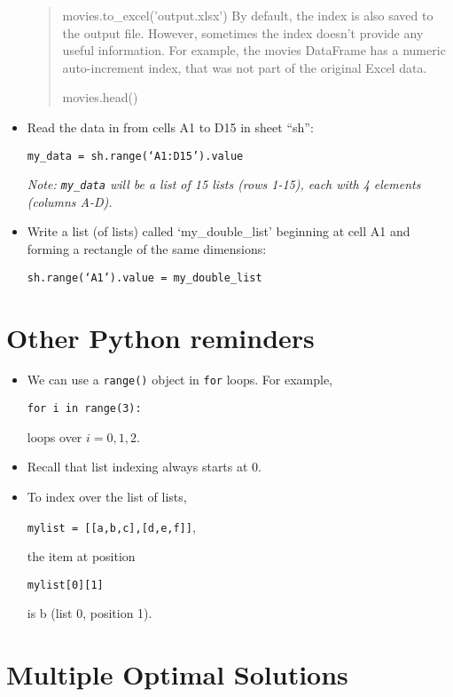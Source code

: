 \documentclass[11pt]{article}
\theoremstyle{definition}
\begin{document}
\begin{itemize}
\begin{quote}
movies.to\_excel('output.xlsx')
By default, the index is also saved to the output file. However, sometimes the index doesn’t provide any useful information. For example, the movies DataFrame has a numeric auto-increment index, that was not part of the original Excel data.

movies.head()
\end{quote}

\item  Read the data in from cells A1 to D15 in sheet ``sh'':  \begin{center} \texttt{my\_data = sh.range(`A1:D15').value} \end{center}
\emph{Note: \texttt{my\_data} will be a list of 15 lists (rows 1-15), each with 4 elements (columns A-D).}

\item Write a list (of lists) called `my\_double\_list' beginning at cell A1 and forming a rectangle of the same dimensions:
\begin{center} \texttt{sh.range(`A1').value = my\_double\_list} \end{center}  
\end{itemize}

\section{Other Python reminders}
\begin{itemize}
\item We can use a \texttt{range()} object in \texttt{for} loops.  For example,
\begin{center} \texttt{for i in range(3):}  \end{center}
loops over $i = 0, 1, 2$.
\item  Recall that list indexing always starts at 0.
\item To index over the list of lists,
\begin{center} \texttt{mylist = [[a,b,c],[d,e,f]]}, \end{center}
the item at position 
\begin{center} \texttt{mylist[0][1]} \end{center}
is b (list 0, position 1).
\end{itemize}


\section{Multiple Optimal Solutions}
\end{document}
